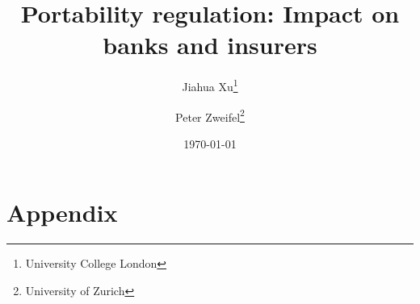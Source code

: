 \documentclass[12pt]{article}
\title{Portability regulation: Impact on banks and insurers}
\author{%
	Jiahua Xu\footnote{University College London}
	\and Peter Zweifel\footnote{University of Zurich}
}
\date{\today}
\numberwithin{equation}{section}
\begin{document}
\maketitle
\thispagestyle{empty}


\newpage






\appendix
\section{Appendix} \label{sec:appendix}




\newpage




\begin{appendix}
%
\end{appendix}
\end{document}
